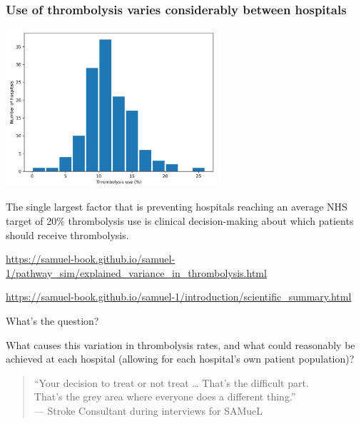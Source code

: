 \documentclass[xcolor={usenames,dvipsnames}]{beamer}
\newcommand{\smallurl}[1]{\textcolor{blue}{\fontsize{4pt}{4.8pt}\selectfont \url{#1}}}
\begin{document}
\begin{frame}
\frametitle{Use of thrombolysis varies considerably between hospitals}
\begin{center}
\includegraphics[width=0.6\textwidth]{./images/thrombolysis_use_between_hospitals}
\end{center}


\footnotesize 
The single largest factor that is preventing hospitals reaching an average NHS target of 20\% thrombolysis use is clinical decision-making about which patients should receive thrombolysis.
\normalsize

\smallurl{https://samuel-book.github.io/samuel-1/pathway_sim/explained_variance_in_thrombolysis.html}

\smallurl{https://samuel-book.github.io/samuel-1/introduction/scientific_summary.html}


\end{frame}



\begin{frame}{What's the question?}

What causes this variation in thrombolysis rates, and what could reasonably be achieved at each hospital (allowing for each hospital's own patient population)?


\vspace{10mm}
\begin{quote}
  ``Your decision to treat or not treat … That’s the difficult part.\\
  That’s the grey area where everyone does a different thing.''\\
  \hfill\footnotesize\textnormal{— Stroke Consultant during interviews for SAMueL}
\end{quote}


\end{frame}
\end{document}
